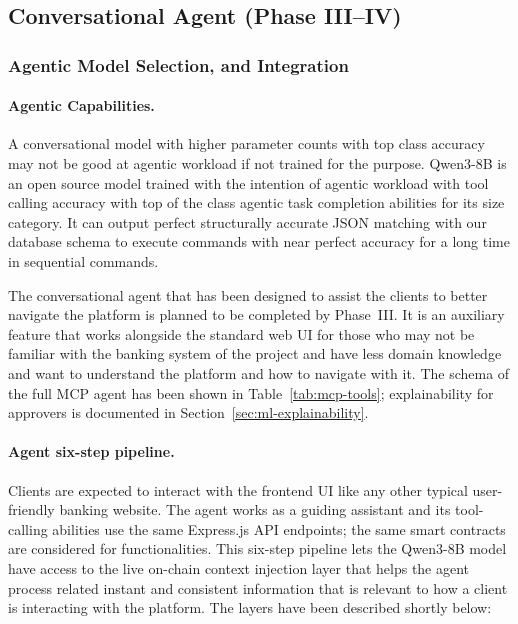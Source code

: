 \documentclass[12pt,a4paper]{report}
\begin{document}
\subsection{Conversational Agent (Phase III--IV)}
\label{sec:optional-agent}

\subsubsection{Agentic Model Selection, and Integration}

\paragraph{Agentic Capabilities.} A conversational model with higher parameter counts with top class accuracy may not be good at agentic workload if not trained for the purpose. Qwen3-8B is an open source model trained with the intention of agentic workload with tool calling accuracy with top of the class agentic task completion abilities for its size category. It can output perfect structurally accurate JSON matching with our database schema to execute commands with near perfect accuracy for a long time in sequential commands.

The conversational agent that has been designed to assist the clients to better navigate the platform is planned to be completed by Phase~III. It is an auxiliary feature that works alongside the standard web UI for those who may not be familiar with the banking system of the project and have less domain knowledge and want to understand the platform and how to navigate with it. The schema of the full MCP agent has been shown in Table~\ref{tab:mcp-tools}; explainability for approvers is documented in Section~\ref{sec:ml-explainability}.

\paragraph{Agent six-step pipeline.} Clients are expected to interact with the frontend UI like any other typical user-friendly banking website. The agent works as a guiding assistant and its tool-calling abilities use the same Express.js API endpoints; the same smart contracts are considered for functionalities. This six-step pipeline lets the Qwen3-8B model have access to the live on-chain context injection layer that helps the agent process related instant and consistent information that is relevant to how a client is interacting with the platform. The layers have been described shortly below:
\end{document}

